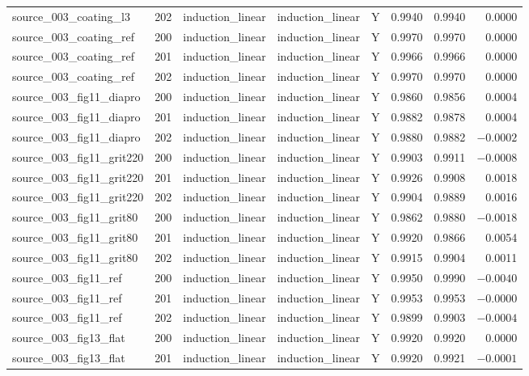 \documentclass{article}
\begin{document}
\begin{table}[htbp]
\begin{tabular}{@{}p{3.0cm}rrp{2.8cm}p{2.8cm}rrr@{}}
source\_003\_coating\_l3 & 202 & induction\_linear & induction\_linear & Y & 0.9940 & 0.9940 & 0.0000 \\
source\_003\_coating\_ref & 200 & induction\_linear & induction\_linear & Y & 0.9970 & 0.9970 & 0.0000 \\
source\_003\_coating\_ref & 201 & induction\_linear & induction\_linear & Y & 0.9966 & 0.9966 & 0.0000 \\
source\_003\_coating\_ref & 202 & induction\_linear & induction\_linear & Y & 0.9970 & 0.9970 & 0.0000 \\
source\_003\_fig11\_diapro & 200 & induction\_linear & induction\_linear & Y & 0.9860 & 0.9856 & 0.0004 \\
source\_003\_fig11\_diapro & 201 & induction\_linear & induction\_linear & Y & 0.9882 & 0.9878 & 0.0004 \\
source\_003\_fig11\_diapro & 202 & induction\_linear & induction\_linear & Y & 0.9880 & 0.9882 & $-0.0002$ \\
source\_003\_fig11\_grit220 & 200 & induction\_linear & induction\_linear & Y & 0.9903 & 0.9911 & $-0.0008$ \\
source\_003\_fig11\_grit220 & 201 & induction\_linear & induction\_linear & Y & 0.9926 & 0.9908 & 0.0018 \\
source\_003\_fig11\_grit220 & 202 & induction\_linear & induction\_linear & Y & 0.9904 & 0.9889 & 0.0016 \\
source\_003\_fig11\_grit80 & 200 & induction\_linear & induction\_linear & Y & 0.9862 & 0.9880 & $-0.0018$ \\
source\_003\_fig11\_grit80 & 201 & induction\_linear & induction\_linear & Y & 0.9920 & 0.9866 & 0.0054 \\
source\_003\_fig11\_grit80 & 202 & induction\_linear & induction\_linear & Y & 0.9915 & 0.9904 & 0.0011 \\
source\_003\_fig11\_ref & 200 & induction\_linear & induction\_linear & Y & 0.9950 & 0.9990 & $-0.0040$ \\
source\_003\_fig11\_ref & 201 & induction\_linear & induction\_linear & Y & 0.9953 & 0.9953 & $-0.0000$ \\
source\_003\_fig11\_ref & 202 & induction\_linear & induction\_linear & Y & 0.9899 & 0.9903 & $-0.0004$ \\
source\_003\_fig13\_flat & 200 & induction\_linear & induction\_linear & Y & 0.9920 & 0.9920 & 0.0000 \\
source\_003\_fig13\_flat & 201 & induction\_linear & induction\_linear & Y & 0.9920 & 0.9921 & $-0.0001$ \\

\end{tabular}
\end{table}
\end{document}
